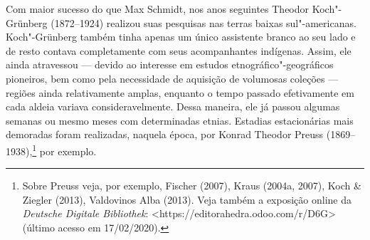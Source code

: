 Com maior sucesso do que Max Schmidt, nos anos seguintes Theodor
Koch"-Grünberg (1872--1924) realizou suas pesquisas nas terras baixas
sul"-americanas. Koch"-Grünberg também tinha apenas um único assistente
branco ao seu lado e de resto contava completamente com seus
acompanhantes indígenas. Assim, ele ainda atravessou --- devido ao
interesse em estudos etnográfico"-geográficos pioneiros, bem como pela
necessidade de aquisição de volumosas coleções --- regiões ainda
relativamente amplas, enquanto o tempo passado efetivamente em cada
aldeia variava consideravelmente. Dessa maneira, ele já passou algumas
semanas ou mesmo meses com determinadas etnias. Estadias estacionárias
mais demoradas foram realizadas, naquela época, por Konrad Theodor
Preuss (1869--1938),\footnote{Sobre Preuss veja, por exemplo, Fischer
  (2007), Kraus (2004a, 2007), Koch \& Ziegler (2013), Valdovinos Alba
  (2013). Veja também a exposição online da \emph{Deutsche Digitale
  Bibliothek}:
  \textless{}https://editorahedra.odoo.com/r/D6G\textgreater{}
  (último acesso em 17/02/2020).} por exemplo.

